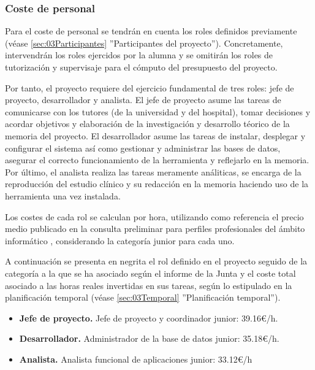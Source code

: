 \subsubsection{Coste de personal}

Para el coste de personal se tendrán en cuenta los roles definidos previamente (véase \ref{sec:03Participantes} ''Participantes del proyecto''). Concretamente, intervendrán los roles ejercidos por la alumna y se omitirán los roles de tutorización y supervisaje para el cómputo del presupuesto del proyecto.

Por tanto, el proyecto requiere del ejercicio fundamental de tres roles: jefe de proyecto, desarrollador y analista. El jefe de proyecto asume las tareas de comunicarse con los tutores (de la universidad y del hospital), tomar decisiones y acordar objetivos y elaboración de la investigación y desarrollo téorico de la memoria del proyecto. El desarrollador asume las tareas de instalar, desplegar y configurar el sistema así como gestionar y administrar las bases de datos, asegurar el correcto funcionamiento de la herramienta y reflejarlo en la memoria. Por último, el analista realiza las tareas meramente análiticas, se encarga de la reproducción del estudio clínico y su redacción en la memoria haciendo uso de la herramienta una vez instalada.

Los costes de cada rol se calculan por hora, utilizando como referencia el precio medio publicado en la consulta preliminar para perfiles profesionales del ámbito informático , considerando la categoría junior para cada uno. 

A continuación se presenta en negrita el rol definido en el proyecto seguido de la categoría a la que se ha asociado según el informe de la Junta y el coste total asociado a las horas reales invertidas en sus tareas, según lo estipulado en la planificación temporal (véase \ref{sec:03Temporal} ''Planificación temporal'').

\begin{itemize}
    \item \textbf{Jefe de proyecto.} Jefe de proyecto y coordinador junior: 39.16€/h.


    \item \textbf{Desarrollador.} Administrador de la base de datos junior: 35.18€/h.


    \item \textbf{Analista.} Analista funcional de aplicaciones junior: 33.12€/h


\end{itemize}

